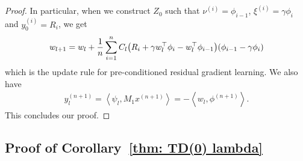 \documentclass{article}
\newcommand{\indot}[2]{{\left<#1, #2\right>}}
\begin{document}
\begin{proof}
    In particular, when we construct $Z_0$ such that $\nu^{(i)} = \phi_{i-1}$, $\xi^{(i)} = \gamma \phi_i$ and $y_0^{(i)} = R_i$, 
    we get
    \begin{align}
        w_{l+1} = w_l + \frac{1}{n}\sum_{i=1}^n C_l \qty(R_i + \gamma w_l^\top \phi_i - w_l^\top \phi_{i-1})\qty(\phi_{i-1} -\gamma \phi_i)
    \end{align}
    which is the update rule for pre-conditioned residual gradient learning.
    We also have
    \begin{align}
        y_l^{(n+1)}
        = \indot{\psi_l}{M_1 x^{(n+1)}} 
        = -\indot{w_l}{\phi^{(n+1)}}.
    \end{align}
    This concludes our proof.
\end{proof}


\subsection{Proof of Corollary~\ref{thm: TD(0) lambda}}
\label{sec proof thm: TD(0) lambda}
\end{document}
